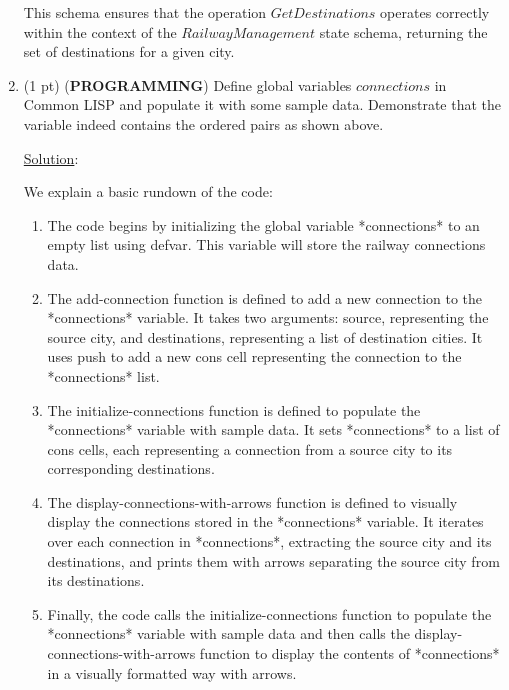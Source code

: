 \documentclass[12pt]{article}
\begin{document}
\begin{spacing}{1.5}
\begin{enumerate}
		      This schema ensures that the operation $GetDestinations$ operates correctly within the context of the $RailwayManagement$ state schema, returning the set of destinations for a given city.
		      		      
		\item (1 pt) (\textbf{PROGRAMMING}) Define global variables $connections$ in Common LISP and populate it with some sample data. Demonstrate that the variable indeed contains the ordered pairs as shown above.
		      
		      \noindent \underline{Solution}:
		      
		      
		      
		      We explain a basic rundown of the code:
		      
		      \begin{enumerate}
		      	\item The code begins by initializing the global variable *connections* to an empty list using defvar. This variable will store the railway connections data.
		      	\item The add-connection function is defined to add a new connection to the *connections* variable. It takes two arguments: source, representing the source city, and destinations, representing a list of destination cities. It uses push to add a new cons cell representing the connection to the *connections* list.
		      	\item  The initialize-connections function is defined to populate the *connections* variable with sample data. It sets *connections* to a list of cons cells, each representing a connection from a source city to its corresponding destinations.
		      	\item The display-connections-with-arrows function is defined to visually display the connections stored in the *connections* variable. It iterates over each connection in *connections*, extracting the source city and its destinations, and prints them with arrows separating the source city from its destinations.
		      	\item Finally, the code calls the initialize-connections function to populate the *connections* variable with sample data and then calls the display-connections-with-arrows function to display the contents of *connections* in a visually formatted way with arrows.
		      \end{enumerate}
		      

\end{enumerate}
\end{spacing}
\end{document}
